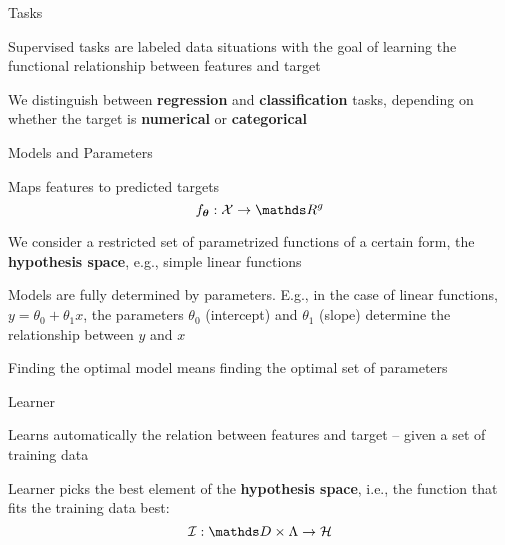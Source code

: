 \documentclass[11pt,compress,t,notes=noshow, xcolor=table]{beamer}
\begin{document}
\begin{framei}{Tasks}
\item Supervised tasks are labeled data situations with the goal of learning the functional relationship between features and target
\item We distinguish between \textbf{regression} and \textbf{classification} tasks, depending on whether the target is \textbf{numerical} or \textbf{categorical}
\vfill
{}
\end{framei}


\begin{framei}[fs=small]{Models and Parameters}
\item Maps features to predicted targets
$$
f_{\thetav} : \Xspace \rightarrow \R^g
$$ 
\item  We consider a restricted set of parametrized functions of a certain form, the \textbf{hypothesis space}, e.g., simple linear functions
\item Models are fully determined by parameters. E.g., in the case of linear functions, $y = \theta_0 + \theta_1 x $, the parameters $\theta_0$ (intercept) and $\theta_1$ (slope) determine the relationship between $y$ and $x$
\item Finding the optimal model means finding the optimal set of parameters
\end{framei}


\begin{framei}{Learner}
\item Learns automatically the relation between features and target -- given a set of training data
\item Learner picks the best element of the \textbf{hypothesis space}, i.e., the function that fits the training data best:
$$
\ind: \preimageInducerShort \rightarrow \Hspace
$$
\vfill
{}
\end{framei}
\end{document}
